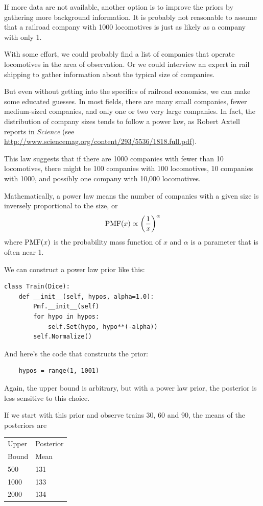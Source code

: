 \documentclass[12pt]{book}
\begin{document}
If more data are not available, another option is to improve the
priors by gathering more background information.  It is probably
not reasonable to assume that a railroad company with 1000 locomotives
is just as likely as a company with only 1.

With some effort, we could probably find a list of companies that
operate locomotives in the area of observation.  Or we could
interview an expert in rail shipping to gather information about
the typical size of companies.

But even without getting into the specifics of railroad economics, we
can make some educated guesses.  In most fields, there are many small
companies, fewer medium-sized companies, and only one or two very
large companies.  In fact, the distribution of company sizes tends to
follow a power law, as Robert Axtell reports in {\it Science} (see
\url{http://www.sciencemag.org/content/293/5536/1818.full.pdf}).

This law suggests that if there are 1000 companies with fewer than
10 locomotives, there might be 100 companies with 100 locomotives,
10 companies with 1000, and possibly one company with 10,000 locomotives.

Mathematically, a power law means the number of companies
with a given size is inversely proportional to the size, or
%
\[ \mathrm{PMF}(x) \propto \left( \frac{1}{x} \right)^{\alpha}   \]
%
where $\mathrm{PMF}(x)$ is the probability mass function of $x$ and $\alpha$ is
a parameter that is often near 1.

We can construct a power law prior like this:

\begin{verbatim}
class Train(Dice):
    def __init__(self, hypos, alpha=1.0):
        Pmf.__init__(self)
        for hypo in hypos:
            self.Set(hypo, hypo**(-alpha))
        self.Normalize()
\end{verbatim}

And here's the code that constructs the prior:

\begin{verbatim}
    hypos = range(1, 1001)
\end{verbatim}

Again, the upper bound is arbitrary, but with a power law
prior, the posterior is less sensitive to this choice.

If we start with this prior and observe trains 30, 60 and 90,
the means of the posteriors are

  \begin{tabular}{|l|l|}
  \hline
  Upper & Posterior \\
  Bound & Mean \\
  \hline
  500 & 131 \\
  1000 & 133 \\
  2000 & 134 \\
  \hline
  \end{tabular}
\end{document}
